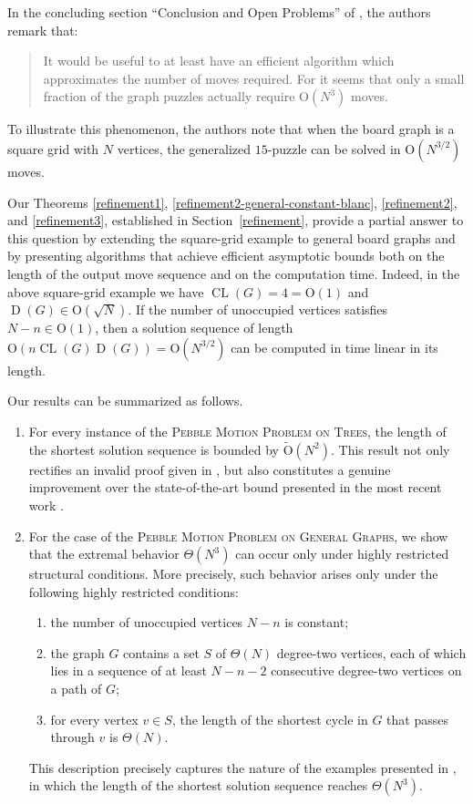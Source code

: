 \documentclass[letter,11pt]{article}
\theoremstyle{definition}
\theoremstyle{definition}
\DeclareMathOperator{\D}{D}
\DeclareMathOperator{\CL}{CL}
\newcommand{\1}{\boldmath$~1~$\unboldmath}
\newcommand{\Ord}{\mathrm{O}}
\begin{document}
In the concluding section ``Conclusion and Open Problems'' of \cite{715921}, 
the authors remark that:
\begin{quote}
It would be useful to at least have an efficient algorithm which approximates 
the number of moves required. For it seems that only a small fraction of the 
graph puzzles actually require $\Ord(N^3)$ moves.
\end{quote}
To illustrate this phenomenon, the authors note that when the board 
graph is a square grid with $N$ vertices, the generalized $15$-puzzle can be 
solved in $\Ord(N^{3/2})$ moves.

Our Theorems \ref{refinement1}, \ref{refinement2-general-constant-blanc}, 
\ref{refinement2}, and \ref{refinement3}, established in Section~\ref{refinement}, 
provide a partial answer to this question by extending the square-grid example 
to general board graphs and by presenting algorithms that achieve efficient 
asymptotic bounds both on the length of the output move sequence and on the 
computation time.
Indeed, in the above square-grid example we have $\CL(G)=4=\Ord(1)$ and
$\D(G)\in\Ord(\sqrt{N})$. 
If the number of unoccupied vertices satisfies $N-n\in\Ord(1)$, then a solution 
sequence of length $\Ord(n\CL(G)\D(G))=\Ord(N^{3/2})$ can be computed in time 
linear in its length.

Our results can be summarized as follows.
\begin{enumerate}
\item For every instance of the \textsc{Pebble Motion Problem on Trees},  
the length of the shortest solution sequence is bounded by $\tilde{\Ord}(N^2)$.  
This result not only rectifies an invalid proof given in \cite{715921}, 
but also constitutes a genuine improvement over the state-of-the-art 
bound presented in the most recent work \cite{WOS:001177663400002}.

\item For the case of the \textsc{Pebble Motion Problem on General Graphs},
we show that the extremal behavior $\Theta(N^3)$ can occur only under highly 
restricted structural conditions.
More precisely, such behavior arises only under the following highly restricted conditions:
\begin{enumerate}
\item the number of unoccupied vertices $N-n$ is constant;
\item the graph $G$ contains a set $S$ of $\Theta(N)$ degree-two vertices, 
each of which lies in a sequence of at least $N-n-2$ consecutive degree-two 
vertices on a path of $G$;
\item for every vertex $v \in S$, the length of the shortest cycle in $G$
that passes through $v$ is $\Theta(N)$.
\end{enumerate}
This description precisely captures the nature of the examples presented 
in \cite{715921}, in which the length of the shortest solution sequence 
reaches $\Theta(N^3)$.
\end{enumerate}
\end{document}
